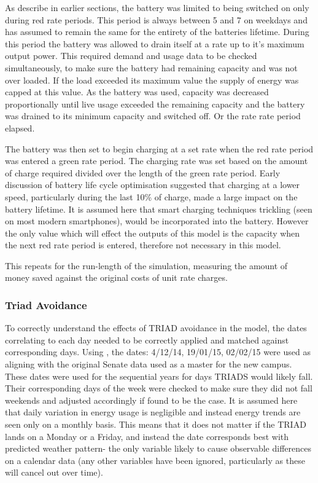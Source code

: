 As describe in earlier sections, the battery was limited to being
switched on only during red rate periods. This period is always between
5 and 7 on weekdays and has assumed to remain the same for the entirety
of the batteries lifetime. During this period the battery was allowed to
drain itself at a rate up to it's maximum output power. This required
demand and usage data to be checked simultaneously, to make sure the
battery had remaining capacity and was not over loaded. If the load
exceeded its maximum value the supply of energy was capped at this
value. As the battery was used, capacity was decreased proportionally
until live usage exceeded the remaining capacity and the battery was
drained to its minimum capacity and switched off. Or the rate rate
period elapsed.

The battery was then set to begin charging at a set rate when the red
rate period was entered a green rate period. The charging rate was set
based on the amount of charge required divided over the length of the
green rate period. Early discussion of battery life cycle optimisation
suggested that charging at a lower speed, particularly during the last
10\% of charge, made a large impact on the battery lifetime. It is
assumed here that smart charging techniques trickling (seen on most
modern smartphones), would be incorporated into the battery. However the
only value which will effect the outputs of this model is the capacity
when the next red rate period is entered, therefore not necessary in
this model.

This repeats for the run-length of the simulation, measuring the amount
of money saved against the original costs of unit rate charges.

\subsubsection{Triad Avoidance}\label{triad-avoidance}

To correctly understand the effects of TRIAD avoidance in the model, the
dates correlating to each day needed to be correctly applied and matched
against corresponding days. Using \autocite{triad15}, the dates:
4/12/14, 19/01/15, 02/02/15 were used as aligning with the original
Senate data used as a master for the new campus. These dates were used
for the sequential years for days TRIADS would likely fall. Their
corresponding days of the week were checked to make sure they did not
fall weekends and adjusted accordingly if found to be the case. It is
assumed here that daily variation in energy usage is negligible and
instead energy trends are seen only on a monthly basis. This means that
it does not matter if the TRIAD lands on a Monday or a Friday, and
instead the date corresponds best with predicted weather pattern- the
only variable likely to cause observable differences on a calendar data
(any other variables have been ignored, particularly as these will
cancel out over time).

